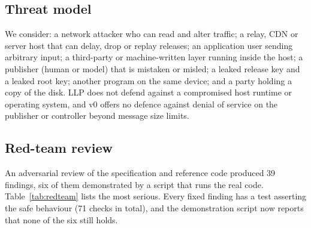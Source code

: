 \documentclass[10pt,twocolumn]{article}
\begin{document}
\subsection{Threat model}

We consider: a network attacker who can read and alter traffic; a relay, CDN or server host that
can delay, drop or replay releases; an application user sending arbitrary input; a third-party or
machine-written layer running inside the host; a publisher (human or model) that is mistaken or
misled; a leaked release key and a leaked root key; another program on the same device; and a
party holding a copy of the disk. LLP does not defend against a compromised host runtime or
operating system, and v0 offers no defence against denial of service on the publisher or
controller beyond message size limits.

\subsection{Red-team review}

An adversarial review of the specification and reference code produced 39 findings, six of them
demonstrated by a script that runs the real code. Table~\ref{tab:redteam} lists the most serious.
Every fixed finding has a test asserting the safe behaviour (71 checks in total), and the
demonstration script now reports that none of the six still holds.
\end{document}
